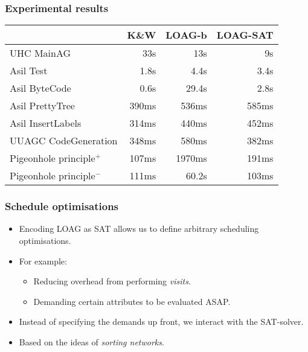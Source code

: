 \documentclass{beamer}
\begin{document}
\begin{frame}
    \frametitle{Experimental results}
    \begin{tabular}{l || r || r || r}
                 &   K\&W & LOAG-b & LOAG-SAT\\
      \hline
      UHC MainAG          & 33s   & 13s   & 9s    \\
      Asil Test              & 1.8s  & 4.4s  & 3.4s  \\
      Asil ByteCode         & 0.6s  & 29.4s & 2.8s  \\
      Asil PrettyTree         & 390ms & 536ms & 585ms \\
      Asil InsertLabels       & 314ms & 440ms & 452ms \\
      UUAGC CodeGeneration&  348ms & 580ms & 382ms \\
      \hline
      Pigeonhole principle$^+$        & 107ms & 1970ms& 191ms \\ 
      Pigeonhole principle$^-$     & 111ms & 60.2s & 103ms
    \end{tabular}
\end{frame}

\begin{frame}
\frametitle{Schedule optimisations}
\begin{itemize}
    \item Encoding LOAG as SAT allows us to define arbitrary scheduling optimisations.
    \item For example:
        \begin{itemize}
            \item Reducing overhead from performing \emph{visits}.
            \item Demanding certain attributes to be evaluated ASAP.
        \end{itemize}
    \item Instead of specifying the demands up front, we interact with the SAT-solver.
    \item Based on the ideas of \emph{sorting networks}.
\end{itemize}
\end{frame}
\end{document}
